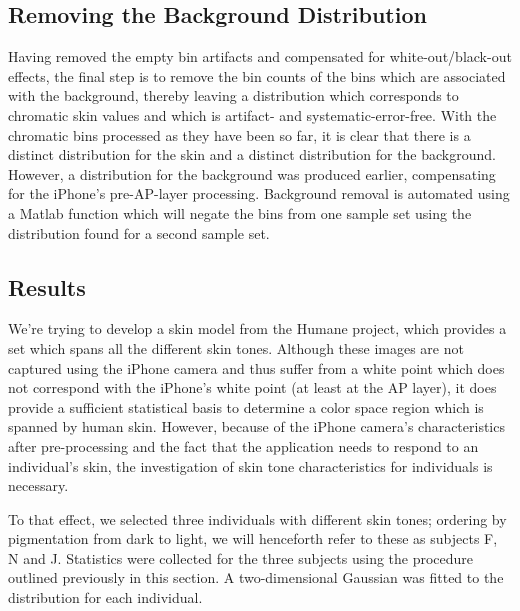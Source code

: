 \subsection{Removing the Background Distribution}\label{sec:RemovingBGDistribution}

Having removed the empty bin artifacts and compensated for white-out/black-out effects, the final step is to remove the bin counts of the bins which are associated with the background, thereby leaving a distribution which corresponds to chromatic skin values and which is artifact- and systematic-error-free. With the chromatic bins processed as they have been so far, it is clear that there is a distinct distribution for the skin and a distinct distribution for the background. However, a distribution for the background was produced earlier, compensating for the iPhone's pre-AP-layer processing. Background removal is automated using a Matlab function which will negate the bins from one sample set using the distribution found for a second sample set.


\subsection{Results}\label{sec:Results}

We're trying to develop a skin model from the Humane project, which provides a set which spans all the different skin tones. Although these images are not captured using the iPhone camera and thus suffer from a white point which does not correspond with the iPhone's white point (at least at the AP layer), it does provide a sufficient statistical basis to determine a color space region which is spanned by human skin. However, because of the iPhone camera's characteristics after pre-processing and the fact that the application needs to respond to an individual's skin, the investigation of skin tone characteristics for individuals is necessary.

To that effect, we selected three individuals with different skin tones; ordering by pigmentation from dark to light, we will henceforth refer to these as subjects F, N and J. Statistics were collected for the three subjects using the procedure outlined previously in this section. A two-dimensional Gaussian was fitted to the distribution for each individual.

